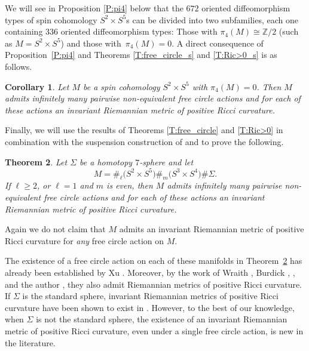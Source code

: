 \documentclass[10pt,a4paper]{amsart}
\numberwithin{equation}{section}
\newtheorem{theoremAlph}{Theorem}
\newtheorem{corollaryAlph}[theoremAlph]{Corollary}
\theoremstyle{definition}
\numberwithin{table}{section}
\newcommand{\Z}{\mathbb{Z}}
\begin{document}
We will see in Proposition \ref{P:pi4} below that the $672$ oriented diffeomorphism types of spin cohomology $S^2\times S^5$s can be divided into two subfamilies, each one containing $336$ oriented diffeomorphism types: Those with $\pi_4(M)\cong\Z/2$ \big(such as $M=S^2\times S^5$\big) and those with~${\pi_4(M)=0}$. A direct consequence of Proposition~\ref{P:pi4} and Theorems \ref{T:free_circle_s} and \ref{T:Ric>0_s} is as follows.
\begin{corollaryAlph}
	Let $M$ be a spin cohomology $S^2\times S^5$ with $\pi_4(M)=0$. Then $M$ admits infinitely many pairwise non-equivalent free circle actions and for each of these actions an invariant Riemannian metric of positive Ricci curvature.
\end{corollaryAlph}

Finally, we will use the results of Theorems \ref{T:free_circle} and \ref{T:Ric>0} in combination with the suspension construction of \cite{Du26} and \cite{GR25} to prove the following.
\begin{theoremAlph}\label{T:conn_sums}
	Let $\Sigma$ be a homotopy $7$-sphere and let
	\[ M=\#_\ell\bigl(S^2\times S^5\bigr)\#_m\bigl(S^3\times S^4\bigr)\#\Sigma. \]
	If $\ell\geq 2$, or $\ell=1$ and $m$ is even, then $M$ admits infinitely many pairwise non-equivalent free circle actions and for each of these actions an invariant Riemannian metric of positive Ricci curvature.
\end{theoremAlph}
Again we do not claim that $M$ admits an invariant Riemannian metric of positive Ricci curvature for \emph{any} free circle action on $M$.

The existence of a free circle action on each of these manifolds in Theorem~\ref{T:conn_sums} has already been established by Xu \cite{Xu25}. Moreover, by the work of Wraith \cite{Wr97}, Burdick \cite[Corollary 1.3.5]{Bu19a}, \cite[Theorem B]{Bu19}, \cite[Theorem B]{Bu20} and the author \cite[Theorem C]{Re23}, they also admit Riemannian metrics of positive Ricci curvature. If $\Sigma$ is the standard sphere, invariant Riemannian metrics of positive Ricci curvature have been shown to exist in \cite[Corollary H]{GR25}. However, to the best of our knowledge, when $\Sigma$ is not the standard sphere, the existence of an invariant Riemannian metric of positive Ricci curvature, even under a single free circle action, is new in the literature.
\end{document}
